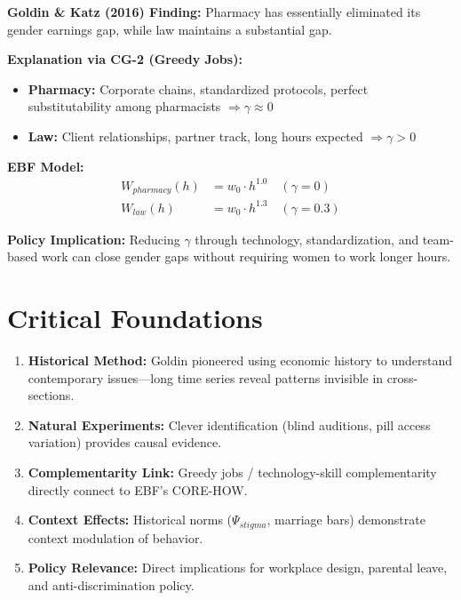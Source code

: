\begin{tcolorbox}[colback=green!5!white, colframe=green!75!black,
    title=Example: Why Pharmacy Has No Gender Gap]

\textbf{Goldin \& Katz (2016) Finding:}
Pharmacy has essentially eliminated its gender earnings gap, while law
maintains a substantial gap.

\textbf{Explanation via CG-2 (Greedy Jobs):}
\begin{itemize}
    \item \textbf{Pharmacy:} Corporate chains, standardized protocols, perfect
    substitutability among pharmacists $\Rightarrow \gamma \approx 0$
    \item \textbf{Law:} Client relationships, partner track, long hours expected
    $\Rightarrow \gamma > 0$
\end{itemize}

\textbf{EBF Model:}
\begin{align}
W_{pharmacy}(h) &= w_0 \cdot h^{1.0} \quad (\gamma = 0) \\
W_{law}(h) &= w_0 \cdot h^{1.3} \quad (\gamma = 0.3)
\end{align}

\textbf{Policy Implication:}
Reducing $\gamma$ through technology, standardization, and team-based work
can close gender gaps without requiring women to work longer hours.

\end{tcolorbox}

\section{Critical Foundations}

\begin{enumerate}
    \item \textbf{Historical Method:} Goldin pioneered using economic history
    to understand contemporary issues---long time series reveal patterns
    invisible in cross-sections.

    \item \textbf{Natural Experiments:} Clever identification (blind auditions,
    pill access variation) provides causal evidence.

    \item \textbf{Complementarity Link:} Greedy jobs / technology-skill
    complementarity directly connect to EBF's CORE-HOW.

    \item \textbf{Context Effects:} Historical norms ($\Psi_{stigma}$, marriage
    bars) demonstrate context modulation of behavior.

    \item \textbf{Policy Relevance:} Direct implications for workplace design,
    parental leave, and anti-discrimination policy.
\end{enumerate}

